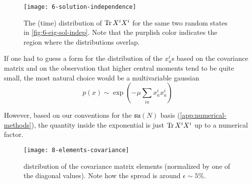 \begin{figure}[H]
    \centering
    \texttt{[image: 6-solution-independence]}
    \caption{The (time) distribution of $\Tr X^i X^i$ for the same two random states in \cref{fig:6-eig-sol-indep}. Note that the purplish color indicates the region where the distributions overlap.}
    \label{fig:6-solution-independence}
\end{figure}

If one had to guess a form for the distribution of the $x^{i}_{a}$s based on the covariance matrix and on the observation that higher central moments tend to be quite small, the most natural choice would be a multivariable gaussian
\begin{equation}
    p(x) \sim \exp \left( - \mu \sum_{i a} x^{i}_{a} x^{i}_{a} \right)
\end{equation}

However, based on our conventions for the $\mathfrak{su}(N)$ basis (\cref{app:numerical-methods}), the quantity inside the exponential is just $\Tr X^i X^i$ up to a numerical factor.

\begin{figure}[H]
    \centering
    \texttt{[image: 8-elements-covariance]}
    \caption{distribution of the covariance matrix elements (normalized by one of the diagonal values). Note how the spread is around $\epsilon \sim 5\%$.}
    \label{fig:8-elements-covariance}
\end{figure}

